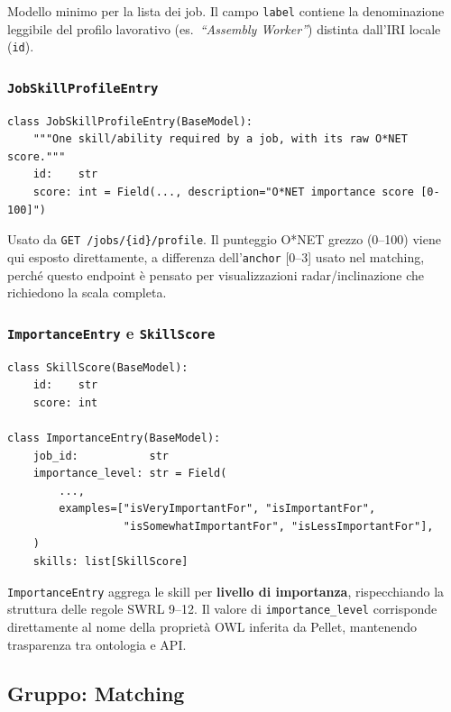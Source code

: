 \documentclass[a4paper,12pt]{article}
\begin{document}
\noindent Modello minimo per la lista dei job. Il campo \texttt{label} contiene
la denominazione leggibile del profilo lavorativo (es.\
\textit{``Assembly Worker''}) distinta dall'IRI locale (\texttt{id}).

\subsubsection{\texttt{JobSkillProfileEntry}}

\begin{lstlisting}[caption={\texttt{JobSkillProfileEntry} --- skill con punteggio O*NET.}]
class JobSkillProfileEntry(BaseModel):
    """One skill/ability required by a job, with its raw O*NET score."""
    id:    str
    score: int = Field(..., description="O*NET importance score [0-100]")
\end{lstlisting}

\noindent Usato da \texttt{GET /jobs/\{id\}/profile}. Il punteggio O*NET grezzo
(0--100) viene qui esposto direttamente, a differenza dell'\texttt{anchor}
[0--3] usato nel matching, perch\'{e} questo endpoint \`{e} pensato per
visualizzazioni radar/inclinazione che richiedono la scala completa.

\subsubsection{\texttt{ImportanceEntry} e \texttt{SkillScore}}

\begin{lstlisting}[caption={Importanza skill per job (Q4).}]
class SkillScore(BaseModel):
    id:    str
    score: int

class ImportanceEntry(BaseModel):
    job_id:           str
    importance_level: str = Field(
        ...,
        examples=["isVeryImportantFor", "isImportantFor",
                  "isSomewhatImportantFor", "isLessImportantFor"],
    )
    skills: list[SkillScore]
\end{lstlisting}

\noindent \texttt{ImportanceEntry} aggrega le skill per \textbf{livello di importanza},
rispecchiando la struttura delle regole SWRL 9--12. Il valore di
\texttt{importance\_level} corrisponde direttamente al nome della
propriet\`{a} OWL inferita da Pellet, mantenendo trasparenza tra
ontologia e API.

\subsection{Gruppo: Matching}
\end{document}
